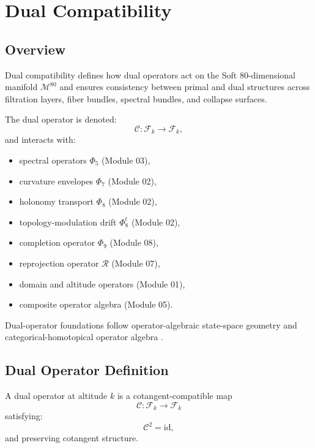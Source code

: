 
\section{Dual Compatibility}
\label{sec:DualCompatibility}

\subsection{Overview}
Dual compatibility defines how dual operators act on the Soft 80-dimensional
manifold $\mathcal{M}^{80}$ and ensures consistency between primal and dual
structures across filtration layers, fiber bundles, spectral bundles, and
collapse surfaces.

The dual operator is denoted:
\[
\mathcal{C} : \mathcal{F}_k \to \mathcal{F}_k,
\]
and interacts with:
\begin{itemize}
    \item spectral operators $\Phi_5$ (Module 03),
    \item curvature envelopes $\Phi_7$ (Module 02),
    \item holonomy transport $\Phi_8$ (Module 02),
    \item topology-modulation drift $\Phi_8^t$ (Module 02),
    \item completion operator $\Phi_9$ (Module 08),
    \item reprojection operator $\mathcal{R}$ (Module 07),
    \item domain and altitude operators (Module 01),
    \item composite operator algebra (Module 05).
\end{itemize}

Dual-operator foundations follow operator-algebraic state-space geometry
 and categorical-homotopical operator algebra
.

\subsection{Dual Operator Definition}
\begin{definition}
A dual operator at altitude $k$ is a cotangent-compatible map
\[
\mathcal{C} : \mathcal{F}_k \to \mathcal{F}_k
\]
satisfying:
\[
\mathcal{C}^2 = \mathrm{id},
\]
and preserving cotangent structure.
\end{definition}


